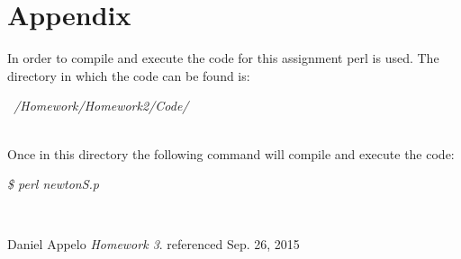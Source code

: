 \documentclass[12pt]{article}
\theoremstyle{definition}
\theoremstyle{definition}
\begin{document}
\section{Appendix}
\indent In order to compile and execute the code for this assignment perl is used. The directory in which the code can be found is:
\\
\begin{center}
\textit{~/Homework/Homework2/Code/}
\end{center}
\\
Once in this directory the following command will compile and execute the code:
\\
\begin{center}
\textit{\$ perl newtonS.p}
\end{center}
\\

\newpage
\begin{thebibliography}{9}
Daniel Appelo
\textit{Homework 3}. 
referenced Sep. 26, 2015

\end{thebibliography}
\end{document}
